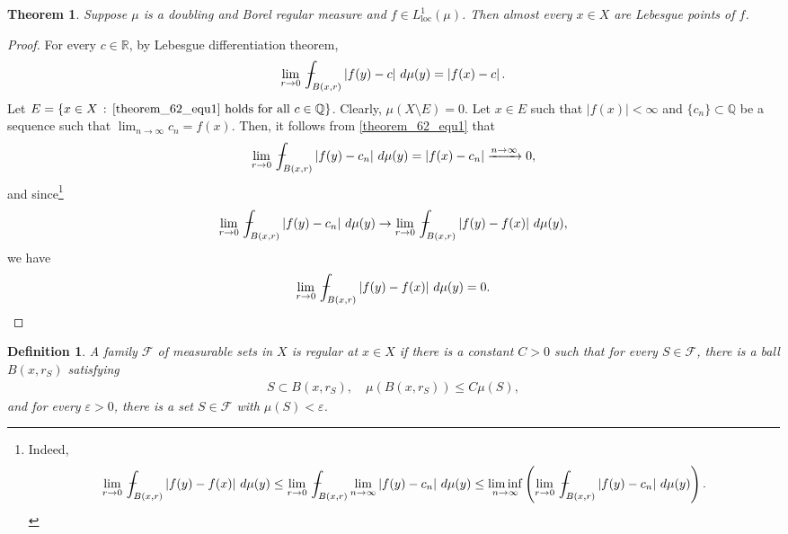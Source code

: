\documentclass[11pt]{book}
\newtheorem{definition}{Definition}[chapter]
\newtheorem{theorem}{Theorem}[chapter]
\theoremstyle{definition}
\numberwithin{equation}{chapter}
\def\avint{\,\ThisStyle{\ensurestackMath{%
  \stackinset{c}{.2\LMpt}{c}{1\LMpt}{\SavedStyle-}{\SavedStyle\phantom{\int}}}%
  \setbox0=\hbox{$\SavedStyle\int\,$}\kern-\wd0}\int}
\begin{document}
\begin{theorem}
Suppose $\mu$ is a doubling and Borel regular measure and $f \in L^1_{\operatorname{loc}}(\mu)$. Then almost every $x \in X$ are Lebesgue points of $f$.
\end{theorem}
\begin{proof}
For every $c \in \mathbb{R}$, by Lebesgue  differentiation theorem,
\begin{align}\label{theorem_62_equ1}
    \lim_{r\to 0} \avint_{B(x,r)} \left|f(y) - c\right| \,d\mu(y) = \left|f(x) - c\right|.
\end{align}
Let $E = \left\{x \in X \,:\, \eqref{theorem_62_equ1} \,\, \text{holds for all} \,\, c \in \mathbb{Q} \right\}$. Clearly, $\mu(X \setminus E) = 0$. Let $x \in E$ such that $\left|f(x)\right| < \infty$ and $\{c_n\} \subset \mathbb{Q}$ be a sequence such that $\lim_{n\to\infty} c_n = f(x)$. Then, it follows from \eqref{theorem_62_equ1} that
\begin{align*}
    \lim_{r\to 0} \avint_{B(x,r)} \left|f(y) - c_n\right| \,d\mu(y) = \left|f(x) - c_n\right| \xrightarrow[]{n \to \infty} 0,
\end{align*}
and since\footnote{Indeed,
\begin{align*}
    \lim_{r\to 0}\avint_{B(x,r)} \left|f(y) - f(x)\right| \,d\mu(y) \leq \lim_{r\to 0}\avint_{B(x,r)} \lim_{n\to\infty} \left|f(y) - c_n\right| \,d\mu(y) \leq \liminf_{n\to\infty} \left(\lim_{r\to 0}\avint_{B(x,r)} \left|f(y) - c_n\right| \,d\mu(y)\right).
\end{align*}}
\begin{align*}
    \lim_{r\to 0} \avint_{B(x,r)} \left|f(y) - c_n\right| \,d\mu(y) \to \lim_{r\to 0} \avint_{B(x,r)} \left|f(y) - f(x)\right| \,d\mu(y),
\end{align*}
we have
\begin{align*}
    \lim_{r\to 0} \avint_{B(x,r)} \left|f(y) - f(x)\right| \,d\mu(y) = 0.
\end{align*}
\end{proof}

\medskip

\begin{definition}
A family $\mathcal{F}$ of measurable sets in $X$ is regular at $x \in X$ if there is a constant $C > 0$ such that for every $S \in \mathcal{F}$, there is a ball $B(x,r_S)$ satisfying
\begin{align*}
    S \subset B(x,r_S), \quad \mu(B(x,r_S)) \leq C \mu(S),
\end{align*}
and for every $\varepsilon > 0$, there is a set $S \in \mathcal{F}$ with $\mu(S) < \varepsilon$.
\end{definition}
\end{document}
